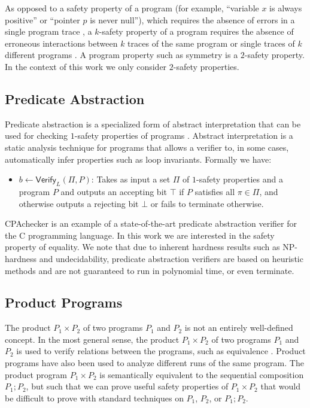 \documentclass[letterpaper,twocolumn,10pt]{article}
\begin{document}
As opposed to a safety property of a program (for example, ``variable $x$ is always positive'' or ``pointer $p$ is never null''), which requires
the absence of errors in a single program trace \cite{alpern1987recognizing}, a $k$-safety property of a program requires the absence of erroneous interactions between $k$
traces of the same program or single traces of $k$ different programs \cite{sousa2016cartesian}. A program property such as symmetry is a $2$-safety property. In the context of this
work we only consider $2$-safety properties.


\subsection{Predicate Abstraction}
\label{sec:predabstraction}

Predicate abstraction is a specialized form of abstract interpretation that can be used for checking $1$-safety properties of programs
\cite{flanagan2002predicate}. Abstract interpretation is a static analysis technique for programs that allows a verifier to, in some cases, 
automatically infer properties such as loop invariants. Formally we have:

\begin{itemize}
    \item $b \gets \mathsf{Verify}_{L}(\Pi, P)$: Takes as input a set $\Pi$ of $1$-safety properties and a program $P$ and outputs an accepting bit $\top$ if
    $P$ satisfies all $\pi \in \Pi$, and otherwise outputs a rejecting bit $\bot$ or fails to terminate otherwise.
\end{itemize}

CPAchecker \cite{beyer2011cpachecker} is an example of a state-of-the-art predicate abstraction verifier for the C programming language. In this work
we are interested in the safety property of equality. We note that due to inherent hardness results such as NP-hardness and undecidability, predicate
abstraction verifiers are based on heuristic methods and are not guaranteed to run in polynomial time, or even terminate.

\subsection{Product Programs}

The product $P_1 \times P_2$ of two programs $P_1$ and $P_2$ is not an entirely well-defined concept. In the most general sense, the product $P_1 \times P_2$ of 
two programs $P_1$ and $P_2$ is used to verify
relations between the programs, such as equivalence \cite{barthe2011relational}. Product programs have also been used to analyze different runs of the same program. 
The product program $P_1 \times P_2$ is semantically equivalent to the sequential composition $P_1; P_2$, but such that we can prove useful 
safety properties of $P_1 \times P_2$ that would be difficult to 
prove with standard techniques on $P_1$, $P_2$, or $P_1; P_2$.
\end{document}
